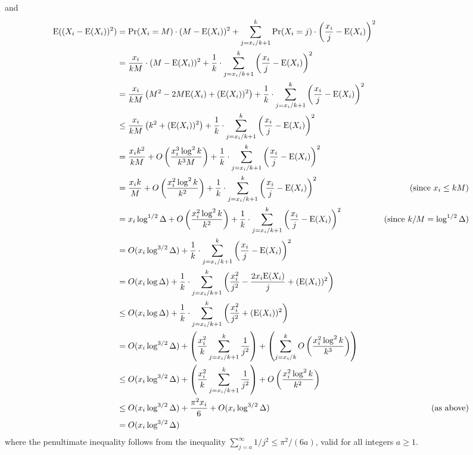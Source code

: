 \documentclass{patmorin}
\begin{document}
and
\begin{align*}
  \mathrm{E}((X_i-\mathrm{E}(X_i))^2)
  & = \Pr(X_i=M)\cdot(M-\mathrm{E}(X_i))^2
    + \sum_{j=x_i/k+1}^k \Pr(X_i=j)\cdot\left(\frac{x_i}{j}-\mathrm{E}(X_i)\right)^2 \\
  & = \frac{x_i}{kM}\cdot(M-\mathrm{E}(X_i))^2
    + \frac{1}{k}\cdot\sum_{j=x_i/k+1}^k \left(\frac{x_i}{j}-\mathrm{E}(X_i)\right)^2 \\
  & = \frac{x_i}{kM}\left(M^2-2M\mathrm{E}(X_i)+(\mathrm{E}(X_i))^2\right)
    + \frac{1}{k}\cdot \sum_{j=x_i/k+1}^k \left(\frac{x_i}{j}-\mathrm{E}(X_i)\right)^2 \\
  & \le \frac{x_i}{kM}\left(k^2 + (\mathrm{E}(X_i))^2\right)
    + \frac{1}{k}\cdot \sum_{j=x_i/k+1}^k \left(\frac{x_i}{j}-\mathrm{E}(X_i)\right)^2 \\
  & = \frac{x_i k^2}{kM} + O\left(\frac{x_i^3\log^2 k}{k^3M}\right)
      + \frac{1}{k}\cdot\sum_{j=x_i/k+1}^k \left(\frac{x_i}{j}-\mathrm{E}(X_i)\right)^2 \\
  & = \frac{x_i k}{M} + O\left(\frac{x_i^2\log^2 k}{k^2}\right)
      + \frac{1}{k}\cdot\sum_{j=x_i/k+1}^k \left(\frac{x_i}{j}-\mathrm{E}(X_i)\right)^2
      & \text{(since $x_i\le kM$)} \\
  & = x_i\log^{1/2}\Delta + O\left(\frac{x_i^2\log^2 k}{k^2}\right)
      + \frac{1}{k}\cdot\sum_{j=x_i/k+1}^k \left(\frac{x_i}{j}-\mathrm{E}(X_i)\right)^2
      & \text{(since $k/M=\log^{1/2}\Delta$)}
      \\
  & = O(x_i\log^{3/2}\Delta) + \frac{1}{k}\cdot\sum_{j=x_i/k+1}^k \left(\frac{x_i}{j}-\mathrm{E}(X_i)\right)^2 \\
 & = O(x_i\log\Delta) + \frac{1}{k}\cdot\sum_{j=x_i/k+1}^k \left(\frac{x_i^2}{j^2}-\frac{2x_i \mathrm{E}(X_i)}{j} + (\mathrm{E}(X_i))^2\right) \\
 & \le O(x_i\log\Delta) + \frac{1}{k}\cdot\sum_{j=x_i/k+1}^k \left(\frac{x_i^2}{j^2} + (\mathrm{E}(X_i))^2\right) \\
 & = O(x_i\log^{3/2}\Delta) +  \left(\frac{x_i^2}{k}\sum_{j=x_i/k+1}^k\frac{1}{j^2}\right)
   + \left(\sum_{j=x_i/k}^k O\left(\frac{x_i^2\log^2 k}{k^3}\right)\right) \\
 & \le O(x_i\log^{3/2}\Delta) + \left(\frac{x_i^2}{k}\sum_{j=x_i/k+1}^k\frac{1}{j^2}\right)
    + O\left(\frac{x_i^2\log^2 k}{k^2}\right)\\
  & \le O(x_i\log^{3/2}\Delta) + \frac{\pi^2 x_i}{6} + O(x_i\log^{3/2}\Delta)
  & \text{(as above)} \\
  & = O(x_i\log^{3/2}\Delta)
\end{align*}
where the penultimate inequality follows from the inequality $\sum_{j=a}^{\infty} 1/j^2 \le \pi^2/(6a)$, valid for all integers $a\ge 1$.
\end{document}
